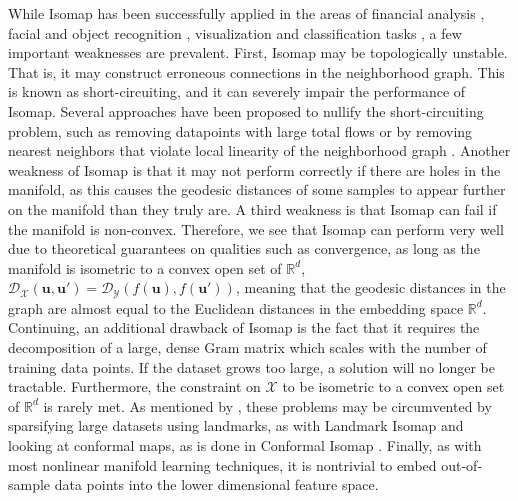While Isomap has been successfully applied in the areas of financial analysis \citep{Ribeiro2008SupervisedIsomap}, facial and object recognition \citep{Zhang2018IsomapMultiManifold}, visualization and classification tasks \citep{Vlachos2002NonlinearDRClassification}, a few important weaknesses are prevalent.  First, Isomap may be topologically unstable.  That is, it may construct erroneous connections in the neighborhood graph.  This is known as short-circuiting, and it can severely impair the performance  of Isomap.  Several approaches have been proposed to nullify the short-circuiting problem, such as removing datapoints with large total flows or by removing nearest neighbors that violate local linearity of the neighborhood graph \citep{VanDerMaaten2009DRReview}.  Another weakness of Isomap is that it may not perform correctly if there are holes  in the manifold, as this causes the geodesic distances of some samples to appear further on the manifold than  they truly are.  A third weakness is that Isomap can fail if the manifold is non-convex.  Therefore, we see that Isomap can perform very well due to theoretical guarantees on qualities such as convergence, as long as the manifold  is isometric to a convex open set of $\mathbb{R}^{d}$, $\mathcal{D}_{\mathcal{X}}(\bm{u},\bm{u}') = \mathcal{D}_{\mathcal{Y}}(f(\bm{u}),f(\bm{u}')) $, meaning that the geodesic distances in the graph are almost equal to the Euclidean distances in the embedding space $\mathbb{R}^{d}$.  Continuing, an additional drawback of Isomap is the fact that it requires the decomposition of a large, dense Gram matrix which scales with the number of training data points.  If the dataset grows too large, a solution will no longer be tractable.  Furthermore, the constraint on $\mathcal{X}$ to be isometric to a convex open set of $\mathbb{R}^{d}$ is rarely met.  As mentioned by \cite{Thorstensen2009ManifoldThesis}, these problems may be circumvented by sparsifying  large datasets using landmarks, as with Landmark Isomap \citep{deSilva2002IsomapReview} and looking at conformal maps, as is done in Conformal Isomap \citep{deSilva2002ConformalIsomap}. Finally, as with most nonlinear manifold learning techniques, it is nontrivial to embed out-of-sample data points into the lower dimensional feature space.  

